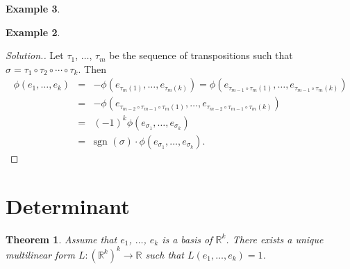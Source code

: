 \documentclass[11pt]{article}
\newtheorem{thm}{Theorem}[section]
\theoremstyle{definition}
\newtheorem{exmp}[thm]{Example}
\theoremstyle{plain}
\begin{document}
\begin{exmp}
\begin{exmp}
\begin{proof}[Solution.]
Let \( \tau_1 \), \( \dots \), \( \tau_m \) be the sequence of transpositions such that \( \sigma=\tau_1\circ\tau_2\circ\cdots\circ \tau_k \). Then \begin{eqnarray*}\phi(e_1, \dots, e_k)&=&-\phi(e_{\tau_m(1)},\dots, e_{\tau_m(k)})=\phi(e_{\tau_{m-1}\circ\tau_m(1)},\dots, e_{\tau_{m-1}\circ\tau_m(k)}) \\&=&-\phi(e_{\tau_{m-2}\circ\tau_{m-1}\circ\tau_m(1)},\dots, e_{\tau_{m-2}\circ\tau_{m-1}\circ\tau_m(k)})\\ &=&(-1)^k\phi(e_{\sigma_1},\dots, e_{\sigma_k})\\ &=&\mbox{sgn }(\sigma)\cdot \phi(e_{\sigma_1},\dots, e_{\sigma_k}). \end{eqnarray*}
\end{proof}

\section{Determinant}

\begin{thm}
Assume that \( e_1 \), \( \dots \), \( e_k \) is a basis of \( \mathbb R^k \). There exists a unique multilinear form \( L: \left(\mathbb R^k\right)^k\to\mathbb R \) such that \( L(e_1,\dots, e_k)=1 \).
\end{thm}


\end{exmp}
\end{exmp}
\end{document}
